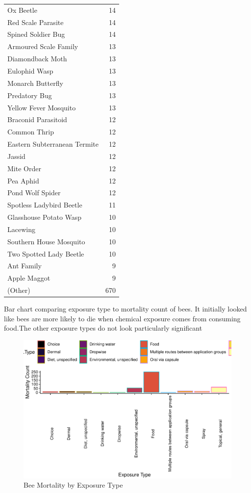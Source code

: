 \documentclass[
  12pt,
]{article}
\begin{document}
\begin{longtable}[]{@{}lr@{}}
Ox Beetle & 14 \\
Red Scale Parasite & 14 \\
Spined Soldier Bug & 14 \\
Armoured Scale Family & 13 \\
Diamondback Moth & 13 \\
Eulophid Wasp & 13 \\
Monarch Butterfly & 13 \\
Predatory Bug & 13 \\
Yellow Fever Mosquito & 13 \\
Braconid Parasitoid & 12 \\
Common Thrip & 12 \\
Eastern Subterranean Termite & 12 \\
Jassid & 12 \\
Mite Order & 12 \\
Pea Aphid & 12 \\
Pond Wolf Spider & 12 \\
Spotless Ladybird Beetle & 11 \\
Glasshouse Potato Wasp & 10 \\
Lacewing & 10 \\
Southern House Mosquito & 10 \\
Two Spotted Lady Beetle & 10 \\
Ant Family & 9 \\
Apple Maggot & 9 \\
(Other) & 670 \\
\bottomrule
\end{longtable}

\newpage

Bar chart comparing exposure type to mortality count of bees. It
initially looked like bees are more likely to die when chemical exposure
comes from consuming food.The other exposure types do not look
particularly significant

\begin{figure}
\centering
\includegraphics{UpdatedwithModel_files/figure-latex/bee exposure-1.pdf}
\caption{Bee Mortality by Exposure Type}
\end{figure}
\end{document}
